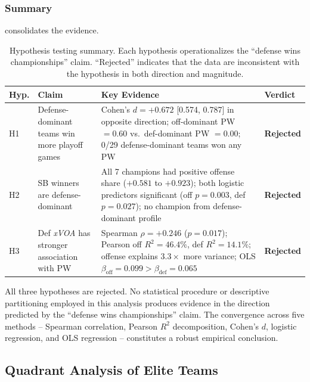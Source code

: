 \documentclass[12pt,a4paper]{article}
\newcommand{\xvoa}{\textit{xVOA}}
\begin{document}
\subsubsection{Summary}

 consolidates the evidence.

\begin{table}[htbp]
  \centering
  \caption{Hypothesis testing summary. Each hypothesis operationalizes the
           ``defense wins championships'' claim. ``Rejected'' indicates that
           the data are inconsistent with the hypothesis in both direction
           and magnitude.}
  \label{tab:hypothesis-summary}
  \small
  \begin{tabularx}{\textwidth}{l p{3.0cm} X l}
    \toprule
    \textbf{Hyp.} & \textbf{Claim}
      & \textbf{Key Evidence} & \textbf{Verdict} \\
    \midrule
    H1 & Defense-dominant teams win more playoff games
      & Cohen's $d = +0.672$ [0.574, 0.787] in opposite direction; off-dominant PW $= 0.60$ vs.\ def-dominant PW $= 0.00$; 0/29 defense-dominant teams won any PW
      & \textbf{Rejected} \\[8pt]
    H2 & SB winners are defense-dominant
      & All 7 champions had positive offense share ($+0.581$ to $+0.923$); both logistic predictors significant (off $p = 0.003$, def $p = 0.027$); no champion from defense-dominant profile
      & \textbf{Rejected} \\[8pt]
    H3 & Def \xvoa{} has stronger association with PW
      & Spearman $\rho = +0.246$ ($p = 0.017$); Pearson off $R^2 = 46.4\%$, def $R^2 = 14.1\%$; offense explains $3.3\times$ more variance; OLS $\beta_{\mathrm{off}} = 0.099 > \beta_{\mathrm{def}} = 0.065$
      & \textbf{Rejected} \\
    \bottomrule
  \end{tabularx}
\end{table}

All three hypotheses are rejected. No statistical procedure or descriptive partitioning employed in this analysis produces evidence in the direction predicted by the ``defense wins championships'' claim. The convergence across five methods -- Spearman correlation, Pearson $R^2$ decomposition, Cohen's $d$, logistic regression, and OLS regression -- constitutes a robust empirical conclusion.

\subsection{Quadrant Analysis of Elite Teams}
\label{sec:quadrant}
\end{document}
